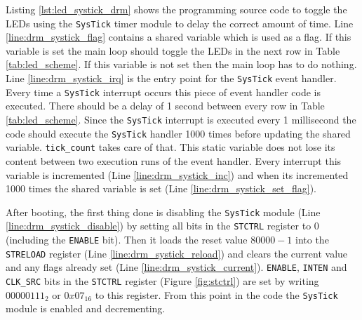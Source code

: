 Listing \ref{lst:led_systick_drm} shows the programming source code to toggle the LEDs using the \texttt{SysTick} timer module to delay the correct amount of time.
Line \ref{line:drm_systick_flag} contains a shared variable which is used as a flag. If this variable is set the main loop should toggle the LEDs in the next row in Table \ref{tab:led_scheme}. If this variable is not set then the main loop has to do nothing.
Line \ref{line:drm_systick_irq} is the entry point for the \texttt{SysTick} event handler.
Every time a \texttt{SysTick} interrupt occurs this piece of event handler code is executed.
There should be a delay of 1 second between every row in Table \ref{tab:led_scheme}. Since the \texttt{SysTick} interrupt is executed every 1 millisecond the code should execute the \texttt{SysTick} handler 1000 times before updating the shared variable.
\texttt{tick\_count} takes care of that. This static variable does not lose its content between two execution runs of the event handler.
Every interrupt this variable is incremented (Line \ref{line:drm_systick_inc}) and when its incremented 1000 times the shared variable is set (Line \ref{line:drm_systick_set_flag}). 

\newpage
After booting, the first thing done is disabling the \texttt{SysTick} module (Line \ref{line:drm_systick_disable}) by setting all bits in the \texttt{STCTRL} register to 0 (including the \texttt{\scriptsize ENABLE} bit).
Then it loads the reset value $80 000 - 1$ into the \texttt{STRELOAD} register (Line \ref{line:drm_systick_reload}) and clears the current value and any flags already set (Line \ref{line:drm_systick_current}).
\texttt{\scriptsize ENABLE}, \texttt{\scriptsize INTEN} and \texttt{\scriptsize CLK\_SRC} bits in the \texttt{STCTRL} register (Figure \ref{fig:stctrl}) are set by writing $00000111_2$ or $0x07_{16}$ to this register.
From this point in the code the \texttt{SysTick} module is enabled and decrementing.
